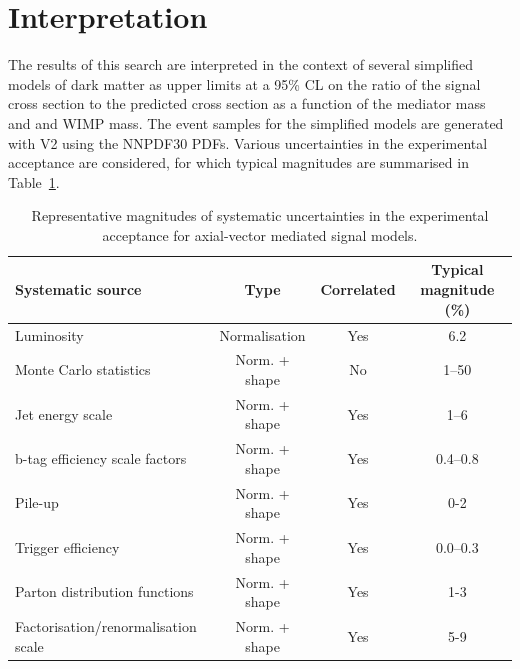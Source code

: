 \clearpage
\section{Interpretation}

The results of this search are interpreted in the context of several simplified models of dark matter as upper limits at a 95\% CL on the ratio of the signal cross section to the predicted cross section as a function of the mediator mass and and WIMP mass. The event samples for the simplified models are generated with \POWHEG V2 using the NNPDF30 PDFs. Various uncertainties in the experimental
acceptance are considered, for which typical magnitudes are summarised in Table~\ref{tab:signal_systs}.

\begin{table}[h!]
  \caption{%
    Representative magnitudes of systematic uncertainties in the experimental
    acceptance for axial-vector mediated signal models.
  }
  \label{tab:signal_systs}
  \centering
  \begin{tabular}{ lccc }
    \hline
    \hline
    Systematic source                   & Type          & Correlated & Typical magnitude (\%) \\
    \hline
    Luminosity                          & Normalisation & Yes        & 6.2                    \\
    Monte Carlo statistics              & Norm. + shape & No         & 1--50                  \\
    Jet energy scale                    & Norm. + shape & Yes        & 1--6                   \\
    b-tag efficiency scale factors      & Norm. + shape & Yes        & 0.4--0.8               \\
    Pile-up                             & Norm. + shape & Yes        & 0-2                    \\
    Trigger efficiency                  & Norm. + shape & Yes        & 0.0--0.3               \\
    Parton distribution functions       & Norm. + shape & Yes        & 1-3                    \\
    Factorisation/renormalisation scale & Norm. + shape & Yes        & 5-9                    \\
    \hline
    \hline
  \end{tabular}
\end{table}
  
